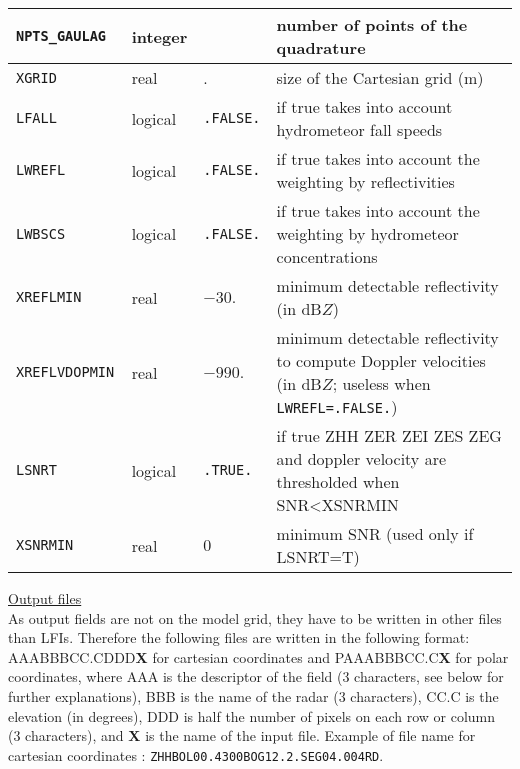 \begin{center}
\begin{makeimage}
\begin{tabular}{|>{\centering}p{2.6cm}|>{\centering}p{3.5cm}|>{\centering}p{1.5cm}| p{8.2cm}|}\hline
	
\tt NPTS\_GAULAG  &integer  & 7&number of points of the quadrature\\\hline
\tt XGRID         &real     & 2000.& size of the Cartesian grid (m)\\\hline
\tt LFALL         &logical  &  \tt.FALSE.&if true takes into account hydrometeor fall speeds\\\hline
\tt LWREFL        &logical  &  \tt.FALSE.&if true takes into account the weighting by reflectivities\\\hline
\tt LWBSCS        &logical  &  \tt.FALSE.&if true takes into account the weighting by hydrometeor concentrations\\\hline
\tt XREFLMIN      &real     & $-30.$& minimum detectable reflectivity (in dB$Z$)\\\hline
\tt XREFLVDOPMIN  & real    & $-990.$&minimum detectable reflectivity to compute Doppler velocities (in dB$Z$; useless when \texttt{LWREFL=.FALSE.})\\\hline
\tt LSNRT         &logical  &  \tt.TRUE.&if true ZHH ZER ZEI ZES ZEG and doppler velocity are thresholded when SNR<XSNRMIN\\\hline
\tt XSNRMIN      &real     & $0$& minimum SNR (used only if LSNRT=T)\\\hline
	
\end{tabular}
\end{makeimage}
\end{center}

\underline{Output files}\\
As output fields are not on the model grid, they have to be written in other files than LFIs. Therefore the following files are written in the following format: AAABBBCC.CDDD{\bf X} for cartesian coordinates and PAAABBBCC.C{\bf X} for polar coordinates, where AAA is the descriptor of the field (3 characters, see below for further explanations), BBB is the name of the radar (3 characters), CC.C is the elevation (in degrees), DDD is half the number of pixels on each row or column (3 characters), and {\bf X} is the name of the input file. Example of file name for cartesian coordinates : {\tt ZHHBOL00.4300BOG12.2.SEG04.004RD}.

